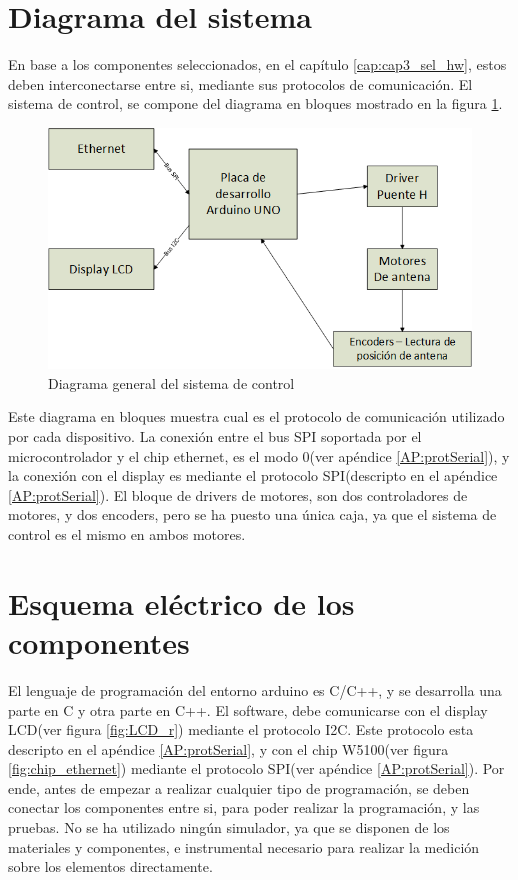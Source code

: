 \section{Diagrama del sistema} 

En base a los componentes seleccionados, en el capítulo \ref{cap:cap3_sel_hw}, estos deben interconectarse entre si, mediante sus protocolos de comunicación. El sistema de control, se compone del  diagrama en bloques mostrado en la figura \ref{fig:sistema_general}.  
\begin{figure}[ht]
	\centering 
	\includegraphics{sistema_general} 
	\caption{Diagrama general del sistema de control} 
	\label{fig:sistema_general}
\end{figure}

Este diagrama en bloques muestra cual es el protocolo de comunicación utilizado por cada dispositivo. La conexión entre el bus SPI soportada por el microcontrolador y el chip ethernet, es el modo 0(ver apéndice \ref{AP:protSerial}), y la conexión con el display es mediante el protocolo SPI(descripto en el apéndice \ref{AP:protSerial}). El bloque de drivers de motores, son dos controladores de motores, y dos encoders, pero se ha puesto una única caja, ya que el sistema de control es el mismo en ambos motores. 

\section{Esquema eléctrico de los componentes}
El lenguaje de programación del entorno arduino es C/C++, y se desarrolla una parte en C y otra parte en C++. El software, debe comunicarse con el display LCD(ver figura \ref{fig:LCD_r}) mediante el protocolo I2C. Este protocolo esta descripto en el apéndice \ref{AP:protSerial}, y con el chip W5100(ver figura \ref{fig:chip_ethernet}) mediante el protocolo SPI(ver apéndice \ref{AP:protSerial}). Por ende, antes de empezar a realizar cualquier tipo de programación, se deben conectar los componentes entre si, para poder realizar la programación, y las pruebas. No se ha utilizado ningún simulador, ya que se disponen de los materiales y componentes, e instrumental necesario para realizar la medición sobre los elementos directamente.  

